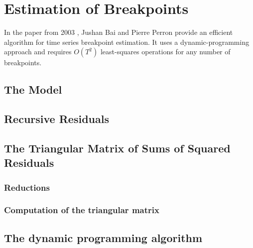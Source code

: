 \documentclass[main.tex]{subfiles}
\begin{document}
\chapter{Estimation of Breakpoints}
\label{chap:estimation_of_breakpoints}
In the paper from 2003 \cite{bai_perron}, Jushan Bai and Pierre Perron provide an
efficient algorithm for time series breakpoint estimation. It uses a dynamic-programming
approach and requires $O(T^2)$ least-squares operations for any number of breakpoints.


\section{The Model}
\label{sec:breakpoints_the_model}

\section{Recursive Residuals}
\label{sec:recursive_residuals}

\section{The Triangular Matrix of Sums of Squared Residuals}
\label{sec:triangular_matrix}
\subsection{Reductions}
\subsection{Computation of the triangular matrix}

\section{The dynamic programming algorithm}
\label{sec:the_dynamic_programming_algorithm}

	


\biblio
\end{document}
